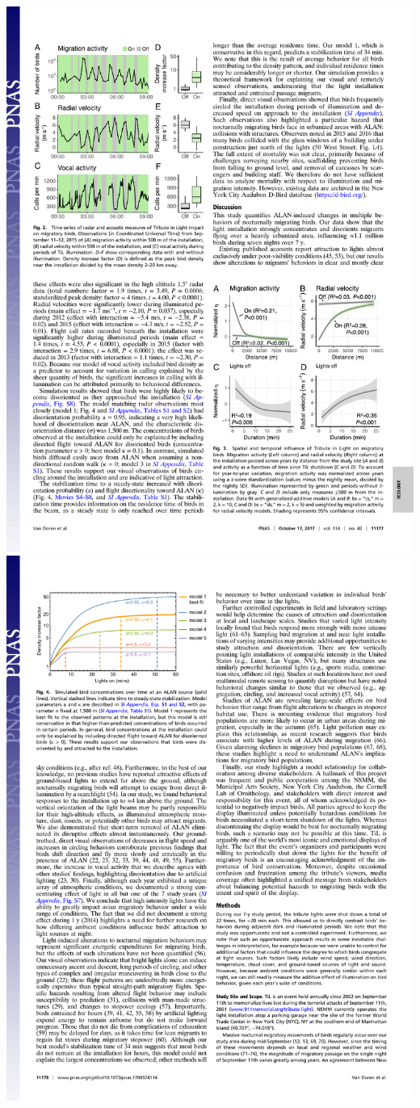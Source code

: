 \documentclass[a4paper, twoside]{templates/ociamthesis}
\begin{document}
\includegraphics[width=1\linewidth]{pdf_chapters/lights/lights_crop_Part3}
\includegraphics[width=1\linewidth]{pdf_chapters/lights/lights_crop_Part4}
\end{document}
